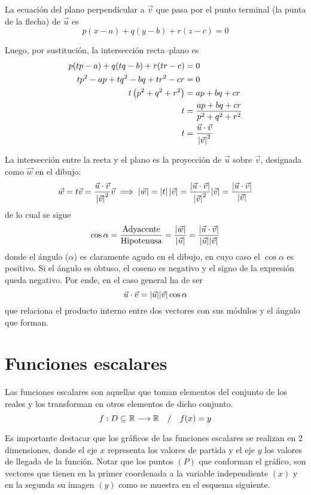 \documentclass[a5paper,12pt,twoside]{book}
\begin{document}
La ecuación del plano perpendicular a $\vec{v}$ que pasa por el punto terminal (la punta de la flecha) de $\vec{u}$ es
\[ p(x-a) + q(y-b) + r(z-c) = 0 \]

Luego, por sustitución, la intersección recta--plano es
\begin{align*}
    p(tp-a) + q(tq-b) + r(tr-c) &= 0
    \\
    tp^2 - ap + tq^2 - bq + tr^2 - cr &= 0
    \\
    t \left(p^2+q^2+r^2\right) &= ap + bq + cr
    \\
    t &= \frac{ap + bq + cr}{p^2+q^2+r^2}
    \\
    t &= \frac{\vec{u} \cdot \vec{v}}{{\left| {\vec{v}} \right|}^2}
\end{align*}

La intersección entre la recta y el plano es la proyección de $\vec{u}$ sobre $\vec{v}$, designada como $\vec{w}$ en el dibujo:
\[
  \vec{w} = t \vec{v} = \frac{\vec{u} \cdot \vec{v}}{{\left| {\vec{v}} \right|}^2} \vec{v}
  \implies
  {\left| {\vec{w}} \right|} = \left| t \right| {\left| {\vec{v}} \right|} = \frac{\left| \vec{u} \cdot \vec{v} \right|}{{\left| {\vec{v}} \right|}^2} {\left| {\vec{v}} \right|} = \frac{\left| \vec{u} \cdot \vec{v} \right|}{{\left| {\vec{v}} \right|}}
\]
de lo cual se sigue
\[ \cos \alpha = \frac{\text{Adyacente}}{\text{Hipotenusa}} = \frac{{\left| {\vec{w}} \right|}}{{\left| {\vec{u}} \right|}} = \frac{\left| \vec{u} \cdot \vec{v} \right|}{{\left| {\vec{u}} \right|}{\left| {\vec{v}} \right|}} \]
donde el ángulo ($\alpha$) es claramente agudo en el dibujo, en cuyo caso el $\cos\alpha$ es positivo.
Si el ángulo es obtuso, el coseno es negativo y el signo de la expresión queda negativo.
Por ende, en el caso general ha de ser
\[ \vec{u} \cdot \vec{v} = {\left| {\vec{u}} \right|} {\left| {\vec{v}} \right|} \cos \alpha \]
que relaciona el producto interno entre dos vectores con sus módulos y el ángulo que forman.


\section{Funciones escalares}
\label{sec:scalarFunctions}

Las funciones escalares son aquellas que toman elementos del conjunto de los reales y los transforman en otros elementos de dicho conjunto.
\[ f: D \subseteq \mathbb{R} \longrightarrow \mathbb{R} \quad / \quad f(x) = y \]

Es importante destacar que los gráficos de las funciones escalares se realizan en 2 dimensiones, donde el eje $x$ representa los valores de partida y el eje $y$ los valores de llegada de la función.
Notar que los puntos $(P)$ que conforman el gráfico, son vectores que tienen en la primer coordenada a la variable independiente $(x)$ y en la segunda su imagen $(y)$ como se muestra en el esquema siguiente.
\end{document}
